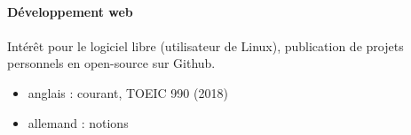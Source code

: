 \documentclass{cv}
\begin{document}
\paragraph{Développement web}
      

\paragraph{} Intérêt pour le logiciel libre (utilisateur de Linux), publication de projets personnels en open-source sur Github.



\begin{itemize}
\item anglais : courant, TOEIC 990 (2018)
\item allemand : notions
\end{itemize}



\end{document}
